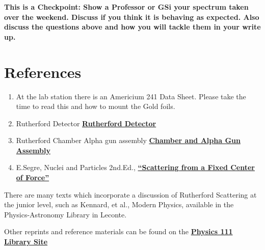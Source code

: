\documentclass{../lab}
\begin{document}
\textbf{ This is a Checkpoint: Show a Professor or GSi your spectrum taken over the weekend. Discuss if you think it is behaving as expected. Also discuss the questions above and how you will tackle them in your write up. }
\section{References}
\label{sec:References}

\begin{enumerate}
    \item At the lab station there is an Americium 241 Data Sheet. Please take the time to read this and how to mount the Gold foils.

    \item Rutherford Detector \href{http://physics111.lib.berkeley.edu/Physics111/Reprints/RUT/RUT\_Detector\_018.JPG}{\textbf{Rutherford Detector}}

    \item Rutherford Chamber Alpha gun assembly \href{http://physics111.lib.berkeley.edu/Physics111/Reprints/RUT/RUT\_Chamber\_017.JPG}{\textbf{Chamber and Alpha Gun Assembly}}

    \item E.Segre, Nuclei and Particles 2nd.Ed., \href{http://physics111.lib.berkeley.edu/Physics111/Reprints/RUT/Scattering\%20From\%20Center\%20appendix\%20a.pdf}{\textbf{``Scattering from a Fixed Center of Force''}}

\end{enumerate}

There are many texts which incorporate a discussion of Rutherford Scattering at the junior level, such as Kennard, et al., Modern Physics, available in the Physics-Astronomy Library in Leconte.

Other reprints and reference materials can be found on the \href{http://physics111.lib.berkeley.edu/Physics111/Reprints/RUT/RUT\_index.html}{\textbf{Physics 111 Library Site}}
\end{document}
